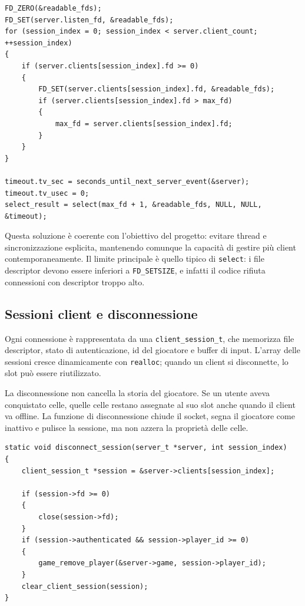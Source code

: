 \documentclass[11pt,a4paper]{article}
\begin{document}
\begin{lstlisting}[caption={Schema del ciclo principale del server, tratto da \texttt{server.c}.}]
FD_ZERO(&readable_fds);
FD_SET(server.listen_fd, &readable_fds);
for (session_index = 0; session_index < server.client_count; ++session_index)
{
    if (server.clients[session_index].fd >= 0)
    {
        FD_SET(server.clients[session_index].fd, &readable_fds);
        if (server.clients[session_index].fd > max_fd)
        {
            max_fd = server.clients[session_index].fd;
        }
    }
}

timeout.tv_sec = seconds_until_next_server_event(&server);
timeout.tv_usec = 0;
select_result = select(max_fd + 1, &readable_fds, NULL, NULL, &timeout);
\end{lstlisting}

Questa soluzione è coerente con l'obiettivo del progetto: evitare thread e sincronizzazione esplicita, mantenendo comunque la capacità di gestire più client contemporaneamente. Il limite principale è quello tipico di \texttt{select}: i file descriptor devono essere inferiori a \texttt{FD\_SETSIZE}, e infatti il codice rifiuta connessioni con descriptor troppo alto.

\subsection{Sessioni client e disconnessione}

Ogni connessione è rappresentata da una \texttt{client\_session\_t}, che memorizza file descriptor, stato di autenticazione, id del giocatore e buffer di input. L'array delle sessioni cresce dinamicamente con \texttt{realloc}; quando un client si disconnette, lo slot può essere riutilizzato.

La disconnessione non cancella la storia del giocatore. Se un utente aveva conquistato celle, quelle celle restano assegnate al suo slot anche quando il client va offline. La funzione di disconnessione chiude il socket, segna il giocatore come inattivo e pulisce la sessione, ma non azzera la proprietà delle celle.

\begin{lstlisting}[caption={Disconnessione di una sessione, tratto da \texttt{server.c}.}]
static void disconnect_session(server_t *server, int session_index)
{
    client_session_t *session = &server->clients[session_index];

    if (session->fd >= 0)
    {
        close(session->fd);
    }
    if (session->authenticated && session->player_id >= 0)
    {
        game_remove_player(&server->game, session->player_id);
    }
    clear_client_session(session);
}
\end{lstlisting}
\end{document}
